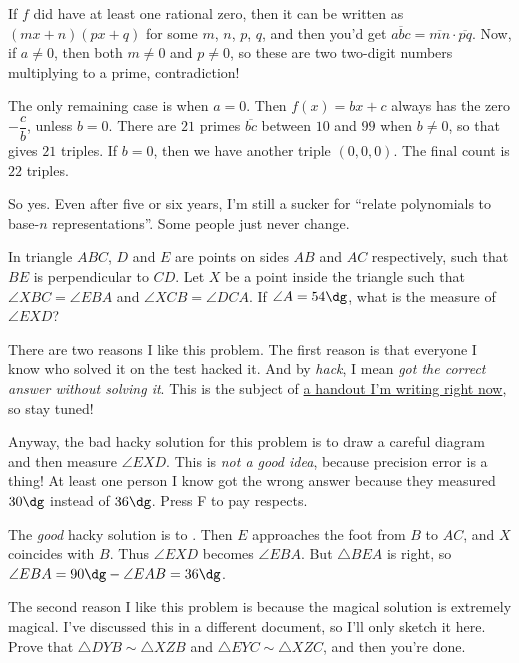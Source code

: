 \documentclass[11pt,paper=letter]{scrartcl}
\begin{document}
If $f$ did have at least one rational zero, then it can be written as $(mx + n)(px + q)$ for some $m$, $n$, $p$, $q$, and then you'd get $\overline{abc} = \overline{mn} \cdot \overline{pq}$. Now, if $a \neq 0$, then both $m \neq 0$ and $p \neq 0$, so these are two two-digit numbers multiplying to a prime, contradiction!

The only remaining case is when $a = 0$. Then $f(x) = bx + c$ always has the zero $-\dfrac cb$, unless $b = 0$. There are $21$ primes $\overline{bc}$ between $10$ and $99$ when $b \neq 0$, so that gives $21$ triples. If $b = 0$, then we have another triple $(0, 0, 0)$. The final count is $22$ triples.

So yes. Even after five or six years, I'm still a sucker for ``relate polynomials to base-$n$ representations''. Some people just never change.

\begin{probboxed}
   In triangle $ABC$, $D$ and $E$ are points on sides $AB$ and $AC$ respectively, such that $BE$ is perpendicular to $CD$. Let $X$ be a point inside the triangle such that $\angle XBC = \angle EBA$ and $\angle XCB = \angle DCA$. If $\angle A = 54\dg$, what is the measure of $\angle EXD$?
\end{probboxed}

There are two reasons I like this problem. The first reason is that everyone I know who solved it on the test hacked it. And by \emph{hack}, I mean \emph{got the correct answer without solving it}. This is the subject of \href{https://cjquines.com/files/drafts/hacking.pdf}{a handout I'm writing right now}, so stay tuned! 

Anyway, the bad hacky solution for this problem is to draw a careful diagram and then measure $\angle EXD$. This is \emph{not a good idea}, because precision error is a thing! At least one person I know got the wrong answer because they measured $30\dg$ instead of $36\dg$. Press F to pay respects.

The \emph{good} hacky solution is to . Then $E$ approaches the foot from $B$ to $AC$, and $X$ coincides with $B$. Thus $\angle EXD$ becomes $\angle EBA$. But $\triangle BEA$ is right, so $\angle EBA = 90\dg - \angle EAB = 36\dg$. 

The second reason I like this problem is because the magical solution is extremely magical. I've discussed this in a different document, so I'll only sketch it here.  Prove that $\triangle DYB \sim \triangle XZB$ and $\triangle EYC \sim \triangle XZC$, and then you're done. 
\end{document}
